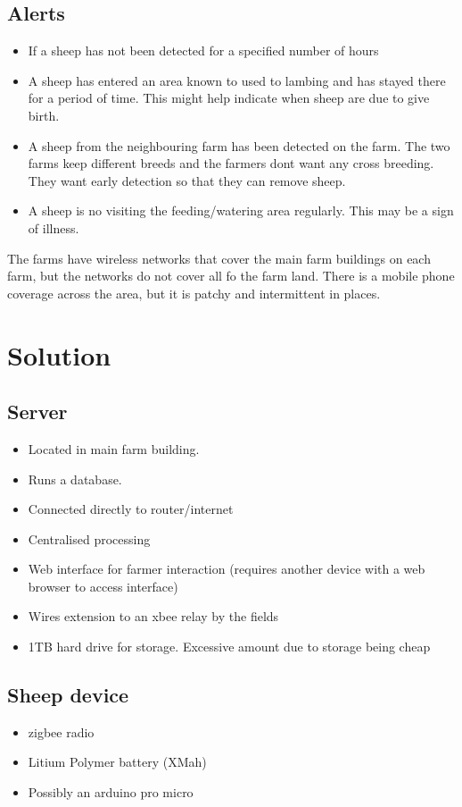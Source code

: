 \documentclass{article}
\begin{document}
\subsection{Alerts}
\begin{itemize}
\item If a sheep has not been detected for a specified number of hours
\item A sheep has entered an area known to used to lambing and has stayed there for a period of time.  This might help indicate when sheep are due to give birth.
\item A sheep from the neighbouring farm has been detected on the farm.  The two farms keep different breeds and the farmers dont want any cross breeding.  They want early detection so that they can remove sheep.
\item A sheep is no visiting the feeding/watering area regularly.  This may be a sign of illness.
\end{itemize}

The farms have wireless networks that cover the main farm buildings on each farm, but the networks do not cover all fo the farm land.  There is a mobile phone coverage across the area, but it is patchy and intermittent in places.

\section{Solution}
\subsection{Server}
\begin{itemize}
\item Located in main farm building.
\item Runs a database.
\item Connected directly to router/internet
\item Centralised processing
\item Web interface for farmer interaction (requires another device with a web browser to access interface)
\item Wires extension to an xbee relay by the fields
\item 1TB hard drive for storage. Excessive amount due to storage being cheap
\end{itemize}

\subsection{Sheep device}
\begin{itemize}
\item zigbee radio
\item Litium Polymer battery (XMah)
\item Possibly an arduino pro micro
\end{itemize}
\end{document}
